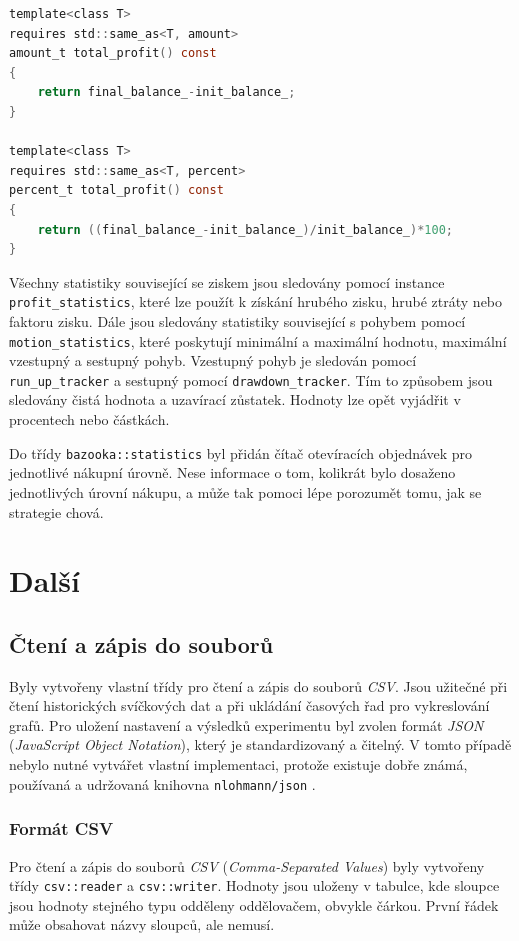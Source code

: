 \begin{lstlisting}[caption={~Metody pro získání celkového zisku v různých jednotkách},label={lst:use:unit:tag},captionpos=t,abovecaptionskip=-\medskipamount,belowcaptionskip=\medskipamount,language=C]
template<class T>
requires std::same_as<T, amount>
amount_t total_profit() const
{
    return final_balance_-init_balance_;
}

template<class T>
requires std::same_as<T, percent>
percent_t total_profit() const
{
    return ((final_balance_-init_balance_)/init_balance_)*100;
}
\end{lstlisting}

Všechny statistiky související se ziskem jsou sledovány pomocí instance \texttt{profit\_statistics}, které lze použít k získání hrubého zisku, hrubé ztráty nebo faktoru zisku.
Dále jsou sledovány statistiky související s pohybem pomocí \texttt{motion\_statistics}, které poskytují minimální a maximální hodnotu, maximální vzestupný a sestupný pohyb.
Vzestupný pohyb je sledován pomocí \texttt{run\_up\_tracker} a sestupný pomocí \texttt{drawdown\_tracker}.
Tím to způsobem jsou sledovány čistá hodnota a uzavírací zůstatek.
Hodnoty lze opět vyjádřit v procentech nebo částkách.

Do třídy \texttt{bazooka::statistics} byl přidán čítač otevíracích objednávek pro jednotlivé nákupní úrovně.
Nese informace o tom, kolikrát bylo dosaženo jednotlivých úrovní nákupu, a může tak pomoci lépe porozumět tomu, jak se strategie chová.

\chapter{Další}
\section{Čtení a zápis do souborů}
Byly vytvořeny vlastní třídy pro čtení a zápis do souborů \textit{CSV}.
Jsou užitečné při čtení historických svíčkových dat a při ukládání časových řad pro vykreslování grafů.
Pro uložení nastavení a výsledků experimentu byl zvolen formát \textit{JSON} (\textit{JavaScript Object Notation}), který je standardizovaný a čitelný.
V tomto případě nebylo nutné vytvářet vlastní implementaci, protože existuje dobře známá, používaná a udržovaná knihovna \texttt{nlohmann/json} \cite{lohmann}.


\subsection{Formát CSV}
Pro čtení a zápis do souborů \textit{CSV} (\textit{Comma-Separated Values}) byly vytvořeny třídy \texttt{csv::reader} a \texttt{csv::writer}.
Hodnoty jsou uloženy v tabulce, kde sloupce jsou hodnoty stejného typu odděleny oddělovačem, obvykle čárkou.
První řádek může obsahovat názvy sloupců, ale nemusí.

